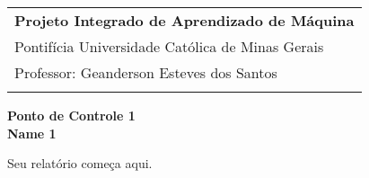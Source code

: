 \documentclass[a4paper,12pt]{article}
\begin{document}
\thispagestyle{empty}

\begin{tabular}{p{15.5cm}}
{\large \bf Projeto Integrado de Aprendizado de Máquina} \\
Pontifícia Universidade Católica de Minas Gerais \\ Professor: Geanderson Esteves dos Santos\\
\hline
\\
\end{tabular}

\vspace*{0.3cm}

\begin{center}
	{\Large \bf Ponto de Controle 1}\\
	\vspace{2mm}
	{\bf Name 1}
\end{center}  

\vspace{0.4cm}

Seu relatório começa aqui.
\end{document}

